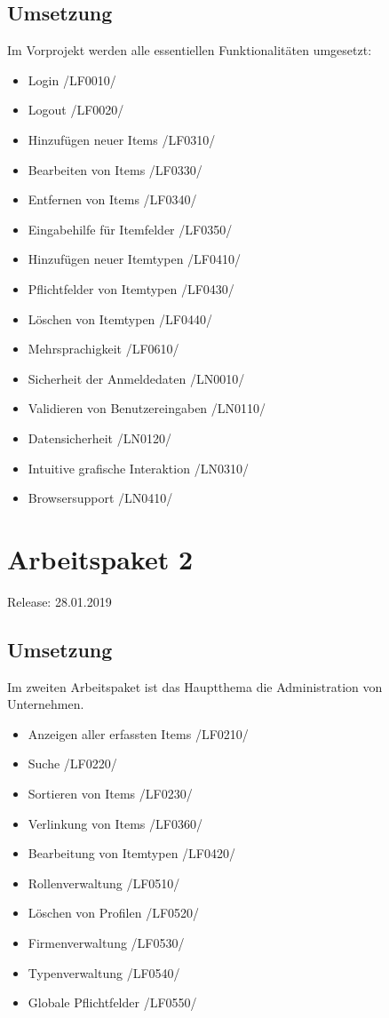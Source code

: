 \documentclass[11pt,a4paper]{report}
\begin{document}
\subsection{Umsetzung}
Im Vorprojekt werden alle essentiellen Funktionalitäten umgesetzt:
\begin{itemize}
\item Login /LF0010/
\item Logout /LF0020/
\item Hinzufügen neuer Items /LF0310/
\item Bearbeiten von Items /LF0330/
\item Entfernen von Items /LF0340/
\item Eingabehilfe für Itemfelder /LF0350/
\item Hinzufügen neuer Itemtypen /LF0410/
\item Pflichtfelder von Itemtypen /LF0430/
\item Löschen von Itemtypen /LF0440/
\item Mehrsprachigkeit /LF0610/
\item Sicherheit der Anmeldedaten /LN0010/
\item Validieren von Benutzereingaben /LN0110/
\item Datensicherheit /LN0120/
\item Intuitive grafische Interaktion /LN0310/
\item Browsersupport /LN0410/
\end{itemize}

\newpage

\section{Arbeitspaket 2}
Release: 28.01.2019
\subsection{Umsetzung}
Im zweiten Arbeitspaket ist das Hauptthema die Administration von Unternehmen.
\begin{itemize}
\item Anzeigen aller erfassten Items /LF0210/
\item Suche /LF0220/
\item Sortieren von Items /LF0230/
\item Verlinkung von Items /LF0360/
\item Bearbeitung von Itemtypen /LF0420/
\item Rollenverwaltung /LF0510/
\item Löschen von Profilen /LF0520/
\item Firmenverwaltung /LF0530/
\item Typenverwaltung /LF0540/
\item Globale Pflichtfelder /LF0550/
\end{itemize}
\end{document}
